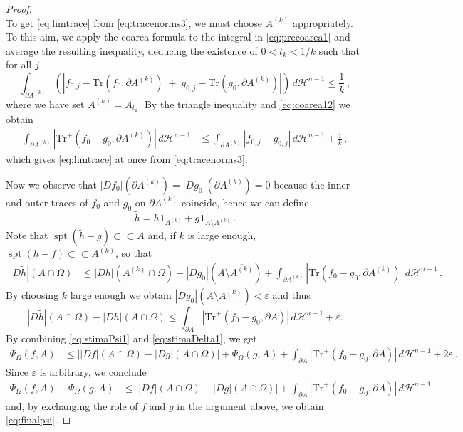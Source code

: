 \documentclass[a4paper,reqno,11pt]{amsart}
\newcommand{\e}{\varepsilon}
\newcommand{\Hau}{{\mathcal H}} %
\newcommand{\de}{\partial}
\newcommand{\spt}{\mathop{\mathrm{spt}}}
\newcommand{\ch}{\mathbf{1}}
\renewcommand{\Subset}{\subset\!\subset}
\newcommand{\Tr}{{\mathrm{Tr}}}
\begin{document}
\begin{proof}
\begin{equation}
\end{equation}
To get \eqref{eq:limtrace} from \eqref{eq:tracenorms3}, we must choose $A^{(k)}$ appropriately. To this aim, we apply the coarea formula to the integral in \eqref{eq:precoarea1} and average the resulting inequality, deducing the existence of $0<t_{k}<1/k$ such that for all $j$
\begin{equation}\label{eq:coarea12}
\int_{\de A^{(k)}} (|f_{0,j} - \Tr(f_{0},\de A^{(k)})| + |g_{0,j} - \Tr(g_{0},\de A^{(k)})|) \, d\Hau^{n-1} \le \frac{1}{k}\,,
\end{equation}
where we have set $A^{(k)} = A_{t_{k}}$. By the triangle inequality and \eqref{eq:coarea12} we obtain
\begin{align*}
\int_{\de A^{(k)}} |\Tr^{+}(f_{0}-g_{0},\de A^{(k)})|\, d\Hau^{n-1} &\le \int_{\de A^{(k)}} |f_{0,j} - g_{0,j}|\, d\Hau^{n-1} + \frac{1}{k}\,,
\end{align*}
which gives \eqref{eq:limtrace} at once from \eqref{eq:tracenorms3}.

Now we observe that $|Df_{0}|(\de A^{(k)}) = |Dg_{0}|(\de A^{(k)}) = 0$ because the inner and outer traces of $f_{0}$ and $g_{0}$ on $\de A^{(k)}$ coincide, hence we can define 
\[
\tilde{h} = h\ch_{A^{(k)}} + g\ch_{A\setminus A^{(k)}}\,.
\] 
Note that $\spt(\tilde{h}-g)\Subset A$ and, if $k$ is large enough, $\spt(h-f)\Subset A^{(k)}$, so that
\begin{align*}
|D\tilde{h}|(A\cap \Omega) &\le |Dh|(A^{(k)}\cap\Omega) + |Dg_{0}|(A\setminus \overline{A^{(k)}}) + \int_{\de A^{(k)}} |\Tr(f_{0}-g_{0},\de A^{(k)})|\, d\Hau^{n-1}\,.
\end{align*}
By choosing $k$ large enough we obtain $|Dg_{0}|(A\setminus A^{(k)}) <\e$ and thus
\begin{equation}\label{eq:stimaDelta1}
|D\tilde{h}|(A\cap \Omega) - |Dh|(A\cap\Omega) \le \int_{\de A} |\Tr^{+}(f_{0}-g_{0},\de A)|\, d\Hau^{n-1} + \e.
\end{equation}
By combining \eqref{eq:stimaPsi1} and \eqref{eq:stimaDelta1}, we get
\begin{align*}
\Psi_{\Omega}(f,A) &\le \big||Df|(A\cap \Omega) - |Dg|(A\cap \Omega)\big| + \Psi_{\Omega}(g,A) + \int_{\de A} |\Tr^{+}(f_{0}-g_{0},\de A)|\, d\Hau^{n-1} + 2\e\,.
\end{align*}
Since $\e$ is arbitrary, we conclude
\begin{align*}
\Psi_{\Omega}(f,A) - \Psi_{\Omega}(g,A) &\le \big||Df|(A\cap \Omega) - |Dg|(A\cap \Omega)\big| + \int_{\de A} |\Tr^{+}(f_{0}-g_{0},\de A)|\, d\Hau^{n-1}
\end{align*}
and, by exchanging the role of $f$ and $g$ in the argument above, we obtain \eqref{eq:finalpsi}.
\end{proof}
\end{document}
